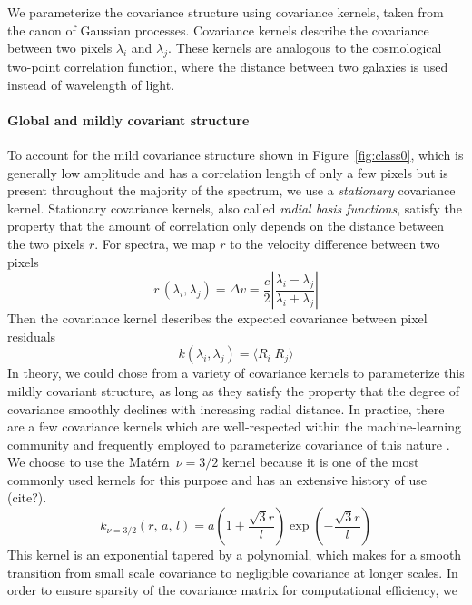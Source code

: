 \documentclass[preprint]{aastex} %
\newcommand{\matern}{Mat\'{e}rn}
\begin{document}
We parameterize the covariance structure using covariance kernels, taken from
the canon of Gaussian processes. Covariance kernels describe the covariance
between two pixels $\lambda_i$ and $\lambda_j$.  These kernels are analogous to
the cosmological two-point correlation function, where the distance
between two galaxies is used instead of wavelength of light.

\paragraph{Global and mildly covariant structure}
To account for the mild covariance structure shown in Figure~\ref{fig:class0},
which is generally low amplitude and has a correlation length of only a few
pixels but is present throughout the majority of the spectrum, we use a
\emph{stationary} covariance kernel. Stationary covariance kernels, also called \emph{radial basis functions}, satisfy the property that the
amount of correlation only depends on the distance between the two pixels $r$.  For spectra,
we map $r$ to the velocity difference between two pixels
\begin{equation}
  r\,(\lambda_i, \lambda_j) = \Delta v = \frac{c}{2} \left | \frac{\lambda_i 
   - \lambda_j}{ \lambda_i + \lambda_j} \right |
\end{equation}
Then the covariance kernel describes the expected covariance between pixel residuals
\begin{equation}
  k(\lambda_i, \lambda_j) =  \langle R_i \; R_j \rangle
  \label{eqn:expectation}
\end{equation}
In theory, we could chose from a variety of covariance kernels to parameterize this mildly covariant structure, as long as they satisfy the property that the degree of covariance smoothly declines with increasing radial distance. In practice, there are a few covariance kernels which are well-respected within the machine-learning community and frequently employed to parameterize covariance of this nature \citep{rw05}. We choose to use the \matern\ $\nu = 3/2$ kernel because it is one of the most commonly used kernels for this purpose and has an extensive history of use (cite?).
\begin{equation}
  k_{\nu = 3/2}(r,\, a,\, l) = a \left(1 + \frac{\sqrt{3} r}{l} \right ) \exp 
   \left (- \frac{\sqrt{3} r}{l} \right )
\end{equation}
This kernel is an exponential tapered by a polynomial, which makes for a smooth transition from small scale covariance to negligible covariance at longer scales. In order to ensure sparsity of the covariance matrix for computational efficiency, we
\end{document}
